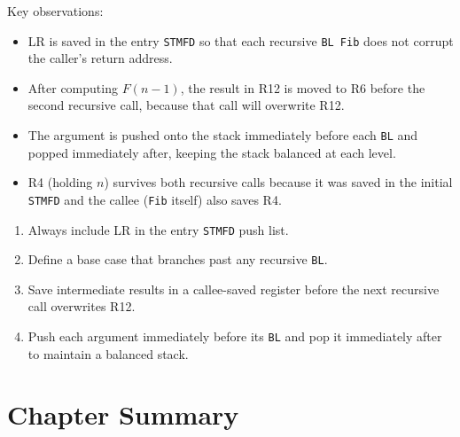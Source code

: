 \documentclass[11pt, a4paper, notitlepage]{report}
\theoremstyle{definition}
\theoremstyle{remark}
\theoremstyle{definition}
\begin{document}
Key observations:

\begin{itemize}
  \item LR is saved in the entry \texttt{STMFD} so that each recursive \texttt{BL Fib} does not corrupt the caller's return address.
  \item After computing $F(n-1)$, the result in R12 is moved to R6 before the second recursive call, because that call will overwrite R12.
  \item The argument is pushed onto the stack immediately before each \texttt{BL} and popped immediately after, keeping the stack balanced at each level.
  \item R4 (holding $n$) survives both recursive calls because it was saved in the initial \texttt{STMFD} and the callee (\texttt{Fib} itself) also saves R4.
\end{itemize}

\begin{keyresult}[title={Rules for Recursive ARM Subroutines}]
\begin{enumerate}
  \item Always include LR in the entry \texttt{STMFD} push list.
  \item Define a base case that branches past any recursive \texttt{BL}.
  \item Save intermediate results in a callee-saved register before the next recursive call overwrites R12.
  \item Push each argument immediately before its \texttt{BL} and pop it immediately after to maintain a balanced stack.
\end{enumerate}
\end{keyresult}

\section{Chapter Summary}
\end{document}
